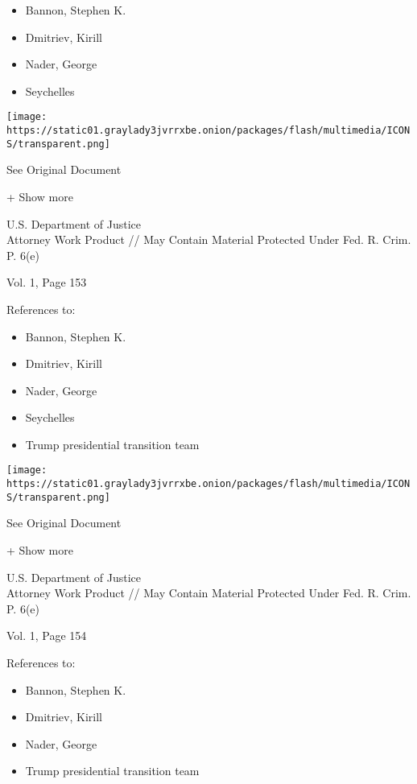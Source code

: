 \begin{itemize}
\tightlist
\item
  Bannon, Stephen K.
\item
  Dmitriev, Kirill
\item
  Nader, George
\item
  Seychelles
\end{itemize}

\protect\hyperlink{}{}

\texttt{[image: https://static01.graylady3jvrrxbe.onion/packages/flash/multimedia/ICONS/transparent.png]}

See Original Document

+ Show more

U.S. Department of Justice\\
Attorney Work Product // May Contain Material Protected Under Fed. R.
Crim. P. 6(e)

Vol. 1, Page 153

References to:

\begin{itemize}
\tightlist
\item
  Bannon, Stephen K.
\item
  Dmitriev, Kirill
\item
  Nader, George
\item
  Seychelles
\item
  Trump presidential transition team
\end{itemize}

\protect\hyperlink{}{}

\texttt{[image: https://static01.graylady3jvrrxbe.onion/packages/flash/multimedia/ICONS/transparent.png]}

See Original Document

+ Show more

U.S. Department of Justice\\
Attorney Work Product // May Contain Material Protected Under Fed. R.
Crim. P. 6(e)

Vol. 1, Page 154

References to:

\begin{itemize}
\tightlist
\item
  Bannon, Stephen K.
\item
  Dmitriev, Kirill
\item
  Nader, George
\item
  Trump presidential transition team
\end{itemize}

